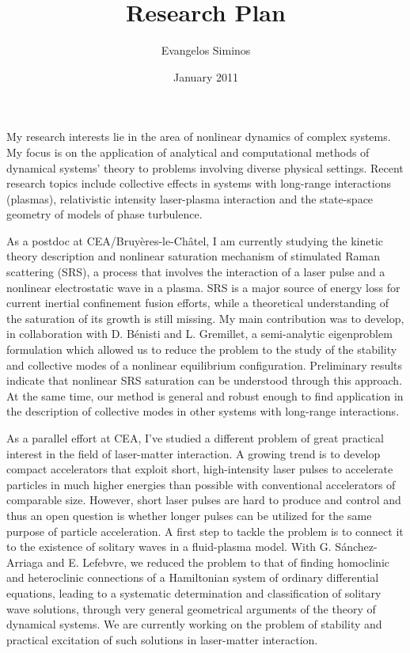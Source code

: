 \documentclass[a4paper,10pt]{article}
\title{Research Plan}
\author{Evangelos Siminos}
\date{January 2011}
\begin{document}
\maketitle

My research interests lie in the area of nonlinear dynamics of 
complex systems. My focus is on the application of analytical and
computational methods of dynamical systems' theory to problems
involving diverse physical settings. Recent research topics include
collective effects in systems with long-range interactions (plasmas),
relativistic intensity laser-plasma interaction and 
the state-space geometry of models of phase turbulence.

As a postdoc at CEA/Bruy\`{e}res-le-Ch\^{a}tel, I am currently studying the
kinetic theory description and nonlinear saturation mechanism of stimulated 
Raman scattering (SRS), a process that involves the interaction of a laser pulse 
and a nonlinear electrostatic wave in a plasma. SRS is a major source of energy 
loss for current inertial confinement fusion efforts, while
a theoretical understanding of the saturation of its growth is still missing.
My main contribution was to develop, in collaboration with D. B\'enisti and L.
Gremillet, a semi-analytic eigenproblem formulation which 
allowed us to reduce the problem to the study of the stability and 
collective modes of a nonlinear equilibrium configuration. Preliminary results
indicate that nonlinear SRS saturation can be understood through this approach.
At the same time, our method is general and robust enough to 
find application in the description of collective modes in other systems with
long-range interactions. %
 
As a parallel effort at CEA, I've studied
 a different problem of great 
practical interest in the field of laser-matter interaction. 
A growing trend is to develop compact accelerators that
exploit short, high-intensity laser pulses to accelerate particles
in much higher energies than possible with conventional accelerators 
of comparable size. However, short laser pulses are hard to produce 
and control and thus an open question is whether longer pulses can be utilized 
for the same purpose of particle acceleration. A first step to tackle the
problem is to connect it to the existence of solitary waves 
in a fluid-plasma model. With G. S\'anchez-Arriaga and E. Lefebvre, we reduced
the problem to that of finding homoclinic and heteroclinic connections
of a Hamiltonian system of ordinary differential equations, leading to a
systematic determination and classification
of solitary wave solutions, through very general geometrical arguments of
the theory of dynamical systems. 
We are currently working on the problem
of stability and practical excitation of such solutions in laser-matter
interaction.
\end{document}
